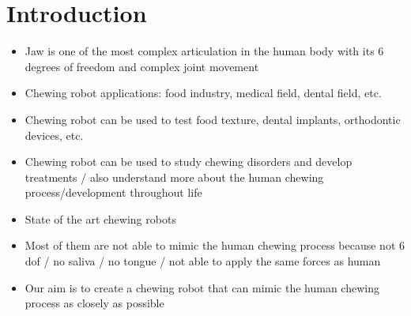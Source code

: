 \section{Introduction}

\begin{itemize}
    \item Jaw is one of the most complex articulation in the human body with its 6 degrees of freedom and complex joint movement
    \item Chewing robot applications: food industry, medical field, dental field, etc.
    \item Chewing robot can be used to test food texture, dental implants, orthodontic devices, etc.
    \item Chewing robot can be used to study chewing disorders and develop treatments / also understand more about the human chewing process/development throughout life
    \item State of the art chewing robots
    \item Most of them are not able to mimic the human chewing process because not 6 dof / no saliva / no tongue / not able to apply the same forces as human
    \item Our aim is to create a chewing robot that can mimic the human chewing process as closely as possible
\end{itemize}


